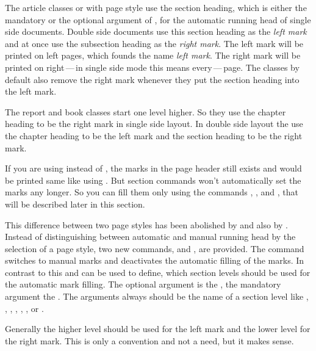 The article classes
 or  with page style
 use the section heading, which
is either the mandatory or the optional argument of , for the
automatic running head of single side documents. Double side documents use
this section heading as the \emph{left mark} and at once use the subsection
heading as the \emph{right mark}. The left mark will be printed on left pages,
which founds the name \emph{left mark}. The right mark will be printed on
right\,---\,in single side mode this means every\,---\,page. The classes by
default also remove the right mark whenever they put the section heading into
the left mark.

The report and book classes  start one level
higher. So they use the chapter heading to be the right mark in single side
layout. In double side layout the use the chapter heading to be the left mark
and the section heading to be the right mark.

If you are using  instead of
, the marks in the page header
still exists and would be printed same like using . But
section commands won't automatically set the marks any longer. So you can fill
them only using the commands , , and
, that will be described later in this section.

This difference between two page styles has been abolished by
 and also by . Instead of distinguishing
between automatic and manual running head by the selection of a page style,
two new commands,  and , are provided. The
command  switches to manual marks and deactivates the
automatic filling of the marks. In contrast to this  and
 can be used to define, which section levels should be used
for the automatic mark filling. The optional argument is the , the mandatory argument the . The arguments always should be the name of a section level
like , , , ,
, , or .

Generally the higher level should be used for the left mark and the lower
level for the right mark. This is only a convention and not a need, but it
makes sense.


